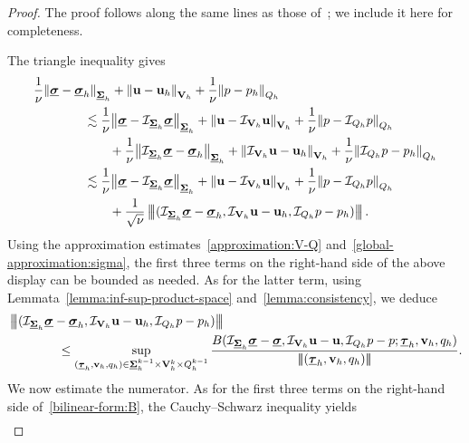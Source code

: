 \documentclass[a4paper,twoside,10pt]{article}
\theoremstyle{plain}
\theoremstyle{remark}
\theoremstyle{definition}
\numberwithin{equation}{section}
\numberwithin{figure}{section}
\newcommand{\Norm}[1]{{\left\|{#1} \right\|}}
\newcommand{\Normthreebars}[3]{\left|\!\left|\!\left| (#1,#2,#3) \right|\!\right|\!\right|}
\newcommand{\Sigmah}{\underline{\boldsymbol{\Sigma}}_h}
\newcommand{\Sigmahkmo}{\Sigmah^{k-1}}
\newcommand{\Vh}{{\bf{V}}_h}
\newcommand{\Vhk}{\Vh^k}
\newcommand{\Qh}{Q_h}
\newcommand{\Qhkmo}{\Qh^{k-1}}
\newcommand{\taubfh}{\underline{\boldsymbol{\tau}}_h}
\newcommand{\vbfh}{\mathbf{v}_h}
\newcommand{\qh}{q_h}
\newcommand{\sigmabfh}{\underline{\boldsymbol{\sigma}}_h}
\newcommand{\ubfh}{\mathbf{u}_h}
\newcommand{\ph}{p_h}
\newcommand{\sigmabf}{\underline{\boldsymbol{\sigma}}}
\newcommand{\ubf}{\mathbf{u}}
\newcommand{\p}{p}
\newcommand{\IcalQhkmo}{\mathcal{I}_{\Qh}}
\newcommand{\IcalVhk}{\mathcal{I}_{\Vh}}
\newcommand{\IcalSigmahkmo}{\mathcal{I}_{\Sigmah}}
\begin{document}
\begin{proof}
The proof follows along the same lines as those of~\cite[Thm.~6.3]{Gopalakrishnan-Lederer-Schoberl:2020};
we include it here for completeness.

The triangle inequality gives
\begin{equation} \label{error-estimate:triangle}
\begin{split}
&\frac{1}{\nu}\Norm{\sigmabf-\sigmabfh}_{\Sigmah} + \Norm{\ubf-\ubfh}_{\Vh} + \frac{1}{\nu}\Norm{\p-\ph}_{\Qh} \\
&\qquad\qquad\lesssim \frac{1}{\nu}\Norm{\sigmabf-\IcalSigmahkmo\sigmabf}_{\Sigmah} + \Norm{\ubf-\IcalVhk\ubf}_{\Vh} + \frac{1}{\nu}\Norm{\p-\IcalQhkmo p}_{\Qh} \\
&\qquad\qquad\qquad +\frac{1}{\nu}\Norm{\IcalSigmahkmo\sigmabf-\sigmabfh}_{\Sigmah} + \Norm{\IcalVhk\ubf-\ubfh}_{\Vh} + \frac{1}{\nu}\Norm{\IcalQhkmo p-\ph}_{\Qh} \\
&\qquad\qquad\lesssim \frac{1}{\nu}\Norm{\sigmabf-\IcalSigmahkmo\sigmabf}_{\Sigmah} + \Norm{\ubf-\IcalVhk\ubf}_{\Vh} + \frac{1}{\nu}\Norm{\p-\IcalQhkmo p}_{\Qh} \\
&\qquad\qquad\qquad +\frac{1}{\sqrt{\nu}}\Normthreebars{\IcalSigmahkmo\sigmabf-\sigmabfh}{\IcalVhk\ubf-\ubfh}{\IcalQhkmo p-\ph}.
\end{split}
\end{equation}
Using the approximation estimates~\eqref{approximation:V-Q} and~\eqref{global-approximation:sigma},
the first three terms on the right-hand side of the above display can be bounded as needed.
As for the latter term,
using Lemmata~\ref{lemma:inf-sup-product-space}
and~\ref{lemma:consistency},
we deduce
\begin{equation} \label{sup:error-estimates}
\begin{split}
&\Normthreebars{\IcalSigmahkmo\sigmabf - \sigmabfh}{\IcalVhk\ubf - \ubfh}{\IcalQhkmo p - \ph} \\
&\qquad\qquad \leq
    \sup_{(\taubfh,\vbfh,\qh)\in\Sigmahkmo\times\Vhk\times\Qhkmo}
    \frac{B(\IcalSigmahkmo\sigmabf - \sigmabf,\IcalVhk\ubf - \ubf,\IcalQhkmo p - p; \taubfh,\vbfh,\qh)}{\Normthreebars{\taubfh}{\vbfh}{\qh}}.
\end{split}
\end{equation}
We now estimate the numerator.
As for the first three terms on the right-hand side of~\eqref{bilinear-form:B},
the Cauchy--Schwarz inequality yields  
\begin{equation} \label{a-bone:estimate}
\begin{split}

\end{split}
\end{equation}
\end{proof}
\end{document}
